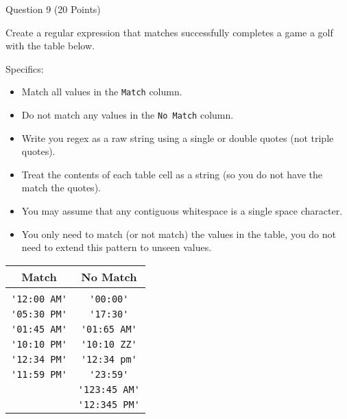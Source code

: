 \documentclass{article}
\begin{document}
\begin{minipage}{\textwidth}
    \noindent
    Question 9 (20 Points)
    \vspace{0.5cm}

    \noindent
    Create a regular expression that matches successfully completes a game a golf with the table below.

    Specifics:
    \begin{itemize}
        \item Match all values in the \verb|Match| column.
        \item Do not match any values in the \verb|No Match| column.
        \item Write you regex as a raw string using a single or double quotes (not triple quotes).
        \item Treat the contents of each table cell as a string (so you do not have the match the quotes).
        \item You may assume that any contiguous whitespace is a single space character.
        \item You only need to match (or not match) the values in the table, you do not need to extend this pattern to unseen values.
    \end{itemize}


    \begin{center}
        \begin{tabular}{ cc }
            Match & No Match \\
            \hline \\
            \verb|'12:00 AM'| & \verb|'00:00'| \\
            \verb|'05:30 PM'| & \verb|'17:30'| \\
            \verb|'01:45 AM'| & \verb|'01:65 AM'| \\
            \verb|'10:10 PM'| & \verb|'10:10 ZZ'| \\
            \verb|'12:34 PM'| & \verb|'12:34 pm'| \\
            \verb|'11:59 PM'| & \verb|'23:59'| \\
            & \verb|'123:45 AM'| \\
            & \verb|'12:345 PM'| \\
        \end{tabular}
    \end{center}

    \vspace{0.5cm}

    \vspace{3cm}

\end{minipage}
\end{document}

